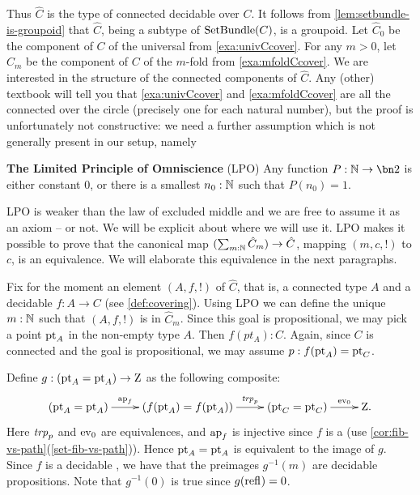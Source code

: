 Thus $\hat C$ is the type of connected decidable \coverings over $C$.
It follows from \cref{lem:setbundle-is-groupoid} that $\hat C$, 
being a subtype of $\mathrm{SetBundle}(C)$, is a groupoid.
Let $\hat C_0$ be the component of $C$ of the universal \covering
from \cref{exa:univCcover}. For any $m>0$, let $\hat C_m$ be the component of $C$
of the $m$-fold \covering from \cref{exa:mfoldCcover}.
We are interested in the structure of the connected components of $\hat C$. 
Any (other) textbook will tell you that \cref{exa:univCcover} and \cref{exa:mfoldCcover}
are all the connected \coverings over 
the circle (precisely one for each natural number), but the proof is unfortunately not constructive: 
we need a further assumption which is not generally present in our setup, namely

\begin{principle}
  \label{LPO}
  {\bf The Limited Principle of Omniscience} (LPO)
  Any function $P:\NN\to\bn 2$ is either constant $0$,
  or there is a smallest $n_0:\mathbb{N}$ such that $P(n_0)=1$.
\end{principle}

LPO is weaker than the law of excluded middle and we are free to assume it as an axiom -- or not.
We will be explicit about where we will use it.
LPO makes it possible to prove that the canonical map $(\sum_{m:\mathbb{N}} \hat C_m) \to \hat C$,
mapping $(m,c,!)$ to $c$, is an equivalence.
We will elaborate this equivalence in the next paragraphs.

Fix for the moment an element $(A,f,!)$ of $\hat C$, that is,
a connected type $A$ and a decidable \covering  $f:A\to C$ (see \cref{def:covering}).
Using LPO we can define the unique $m:\mathbb{N}$ such that $(A,f,!)$ is in $\hat C_m$.
Since this goal is propositional, we may pick a point $\mathrm{pt}_A$ in 
the non-empty type $A$. Then $f(pt_A) : C$. Again, since $C$ is connected
and the goal is propositional, we may assume $p: f(\mathrm{pt}_A) = \mathrm{pt}_C$.

Define $g: (\mathrm{pt}_A=\mathrm{pt}_A)\to\mathrm{Z}$ as the following composite:
\[
\xymatrix{
(\pt_A=\pt_A)\ar[r]^-{\ap{f}}&
(f(\pt_A)=f(\pt_A))\ar[r]^-{\trp{p}}&
(\pt_C=\pt_C)\ar[r]^-{\ev_0}&
\zet.}
\]
Here $\trp{p}$ and $\ev_0$ are equivalences, and $\ap{f}$ is injective
since $f$ is a \covering (use \cref{cor:fib-vs-path}(\ref{set-fib-vs-path})).
Hence $\mathrm{pt}_A=\mathrm{pt}_A$ is equivalent to the image of $g$.
Since $f$ is a decidable \covering, we have that the preimages $g^{-1}(m)$
are decidable propositions. Note that $g^{-1}(0)$ is true since $g(\refl{})=0$.

